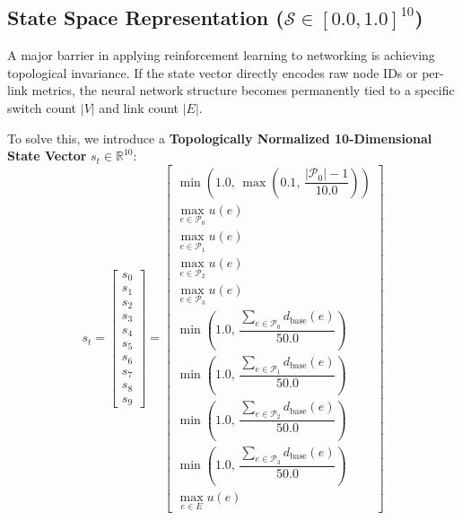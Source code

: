\documentclass[12pt,a4paper,oneside]{report}
\begin{document}
\subsection{State Space Representation ($\mathcal{S} \in [0.0, 1.0]^{10}$)}
A major barrier in applying reinforcement learning to networking is achieving topological invariance. If the state vector directly encodes raw node IDs or per-link metrics, the neural network structure becomes permanently tied to a specific switch count $|V|$ and link count $|E|$. 

To solve this, we introduce a \textbf{Topologically Normalized 10-Dimensional State Vector} $s_t \in \mathbb{R}^{10}$:
\begin{equation}
    s_t = \begin{bmatrix} 
        s_0 \\ s_1 \\ s_2 \\ s_3 \\ s_4 \\ s_5 \\ s_6 \\ s_7 \\ s_8 \\ s_9 
    \end{bmatrix} = \begin{bmatrix}
        \min\left(1.0, \, \max\left(0.1, \, \dfrac{|\mathcal{P}_0| - 1}{10.0}\right)\right) \\[0.5em]
        \max_{e \in \mathcal{P}_0} u(e) \\[0.5em]
        \max_{e \in \mathcal{P}_1} u(e) \\[0.5em]
        \max_{e \in \mathcal{P}_2} u(e) \\[0.5em]
        \max_{e \in \mathcal{P}_3} u(e) \\[0.5em]
        \min\left(1.0, \, \dfrac{\sum_{e \in \mathcal{P}_0} d_{\text{base}}(e)}{50.0}\right) \\[0.5em]
        \min\left(1.0, \, \dfrac{\sum_{e \in \mathcal{P}_1} d_{\text{base}}(e)}{50.0}\right) \\[0.5em]
        \min\left(1.0, \, \dfrac{\sum_{e \in \mathcal{P}_2} d_{\text{base}}(e)}{50.0}\right) \\[0.5em]
        \min\left(1.0, \, \dfrac{\sum_{e \in \mathcal{P}_3} d_{\text{base}}(e)}{50.0}\right) \\[0.5em]
        \max_{e \in E} u(e)
    \end{bmatrix}
    \label{eq:state_vector_full}
\end{equation}
\end{document}
